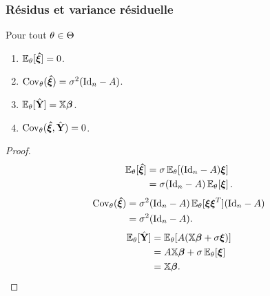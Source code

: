 \begin{frame}
\frametitle{Résidus et variance résiduelle}
\begin{theorem}
Pour tout $\theta \in \Theta$
\begin{enumerate}
\item  \alert<1>{$\operatorname{{\mathbb E}}_{\theta}[\boldsymbol{\hat{\xi}}] = 0$}.
\item  \alert<2>{$\mathrm{Cov}_{\theta}(\boldsymbol{\hat{\xi}})= \sigma^2 (\mathrm{Id}_{n} - A)$}.
\item  \alert<3>{$\operatorname{{\mathbb E}}_{\theta}[\hat{\mathbf{Y}}]= \mathbb{X} \boldsymbol{\beta}$}.
\item  \alert<4>{$\mathrm{Cov}_{\theta}(\boldsymbol{\hat{\xi}},\hat{\mathbf{Y}})= 0$}.
\end{enumerate}
\end{theorem}
\begin{proof}
 {
\begin{align*}
\operatorname{{\mathbb E}}_{\theta}[\boldsymbol{\hat{\xi}}] &= \sigma \operatorname{{\mathbb E}}_{\theta}[ (\mathrm{Id}_{n}-A) \boldsymbol{\xi}] \\
&= \sigma (\mathrm{Id}_{n}-A) \operatorname{{\mathbb E}}_{\theta}[\boldsymbol{\xi}] \,.
\end{align*}
}
 {
\begin{align*}
\mathrm{Cov}_{\theta}(\boldsymbol{\hat{\xi}})&= \sigma^2 (\mathrm{Id}_{n}-A) \operatorname{{\mathbb E}}_{\theta}[\boldsymbol{\xi} \boldsymbol{\xi}^T] (\mathrm{Id}_{n}- A) \\
&= \sigma^2 (\mathrm{Id}_{n}-A).
\end{align*}
}
 {
\begin{align*}
\operatorname{{\mathbb E}}_{\theta}[\hat{\mathbf{Y}}] &= \operatorname{{\mathbb E}}_{\theta}[ A (\mathbb{X} \boldsymbol{\beta} + \sigma \boldsymbol{\xi})] \\
&=  A \mathbb{X} \boldsymbol{\beta} + \sigma \operatorname{{\mathbb E}}_{\theta}[ \boldsymbol{\xi}] \\
&= \mathbb{X} \boldsymbol{\beta}.
\end{align*}
}
\end{proof}
\end{frame}



